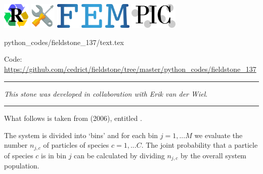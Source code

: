 \includegraphics[height=1.25cm]{images/pictograms/replication}
\includegraphics[height=1.25cm]{images/pictograms/tools}
\includegraphics[height=1.25cm]{images/pictograms/FEM}
\includegraphics[height=1.25cm]{images/pictograms/pic}


\begin{flushright} {\tiny {\color{gray} python\_codes/fieldstone\_137/text.tex}} \end{flushright}

%

\begin{center}
\inpython
Code: \url{https://github.com/cedrict/fieldstone/tree/master/python_codes/fieldstone_137}
\end{center}

\par\noindent\rule{\textwidth}{0.4pt}

{\sl This stone was developed in collaboration with Erik van der Wiel}. 

\par\noindent\rule{\textwidth}{0.4pt}

What follows is taken from \textcite{cakm06} (2006), entitled . 

The system is divided into `bins' and for each bin $j=1,...M$ we evaluate 
the number $n_{j,c}$ of particles of species $c=1,...C$.
The joint probability that a particle of species $c$
is in bin $j$ can be calculated by dividing $n_{j,c}$ by the overall system population.

